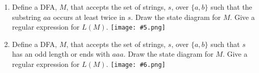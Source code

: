 \documentclass{article}
\begin{document}
\begin{enumerate}
\item Define a DFA, $M$, that accepts the set of strings, $s$, over
  $\{a, b\}$ such that the substring $aa$ occurs at least twice in
  $s$. Draw the state 
  diagram for $M$. Give a regular expression for $L(M)$. 
  \newline \texttt{[image: \#5.png]}

\item Define a DFA, $M$, that accepts the set of strings, $s$, over
  $\{a, b\}$ such that $s$ has an odd length or ends with $aaa$.
  Draw the state
  diagram for $M$. Give a regular expression for $L(M)$. 
  \newline \texttt{[image: \#6.png]}

\end{enumerate}  
     
\end{document}

